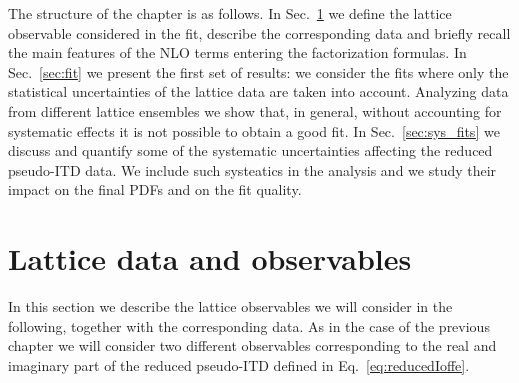 The structure of the chapter is as  follows.  In Sec.~\ref{sec:data} we define the lattice observable considered in the fit,
describe the corresponding data and  briefly recall the main features of the NLO terms entering the factorization formulas.
In Sec.~\ref{sec:fit} we present the first set of results:
we consider the  fits where only the statistical uncertainties of the lattice data are taken into account.
Analyzing data from different lattice ensembles we 
show that, in general, without accounting for systematic effects  it is not possible to obtain a good fit.
In Sec.~\ref{sec:sys_fits} we discuss and quantify some of the systematic uncertainties affecting
the reduced pseudo-ITD data.  We include such systeatics in the analysis and we study their impact on the final PDFs
and on the fit quality.


\section{Lattice data and observables}
\label{sec:data}

In this section we describe the lattice observables we will consider in the following, together with the corresponding data.
As in the case of the previous chapter we will consider two different observables corresponding to 
the real and imaginary part of the reduced pseudo-ITD defined in Eq.~\eqref{eq:reducedIoffe}.
 
